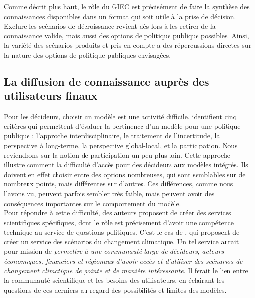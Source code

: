 Comme décrit plus haut, le rôle du GIEC est précisément de faire la synthèse des connaissances disponibles dans un format qui soit utile à la prise de décision. Exclure les scénarios de décroissance revient dès lors à les retirer de la connaissance valide, mais aussi des options de politique publique possibles. Ainsi, la variété des scénarios produits et pris en compte a des répercussions directes sur la nature des options de politique publiques envisagées. 

\subsection{La diffusion de connaissance auprès des utilisateurs finaux}

Pour les décideurs, choisir un modèle est une activité difficile. \textcite{boulanger_models_2005} identifient cinq critères qui permettent d'évaluer la pertinence d'un modèle pour une politique publique : l'approche interdisciplinaire, le traitement de l'incertitude, la perspective à long-terme, la perspective global-local, et la participation. Nous reviendrons sur la notion de participation un peu plus loin. Cette approche illustre comment la difficulté d'accès pour des décideurs aux modèles intégrés. Ils doivent en effet choisir entre des options nombreuses, qui sont semblables sur de nombreux points, mais différentes sur d'autres. Ces différences, comme nous l'avons vu, peuvent parfois sembler très faible, mais peuvent avoir des conséquences importantes sur le comportement du modèle. \\


Pour répondre à cette difficulté, des auteurs proposent de créer des services scientifiques spécifiques, dont le rôle est précisement d'avoir une compétence technique au service de questions politiques. C'est le cas de \textcite{auer_climate_2021}, qui proposent de créer un service des scénarios du changement climatique. Un tel service aurait pour mission de \emph{permettre à une communauté large de décideurs, acteurs économiques, financiers et régionaux d'avoir accès et d'utiliser des scénarios de changement climatique de pointe et de manière intéressante}. Il ferait le lien entre la communauté scientifique et les besoins des utilisateurs, en éclairant les questions de ces derniers au regard des possibilités et limites des modèles. \\

